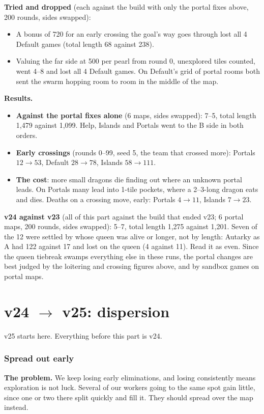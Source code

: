 \documentclass[11pt,a4paper]{article}
\begin{document}
\textbf{Tried and dropped} (each against the build with only the portal fixes above, 200 rounds, sides swapped):
\begin{itemize}
  \item A bonus of 720 for an early crossing the goal's way goes through lost all 4 Default games (total length 68 against 238).
  \item Valuing the far side at 500 per pearl from round 0, unexplored tiles counted, went 4--8 and lost all 4 Default games.
        On Default's grid of portal rooms both sent the swarm hopping room to room in the middle of the map.
\end{itemize}
\textbf{Results.}
\begin{itemize}
  \item \textbf{Against the portal fixes alone} (6 maps, sides swapped): 7--5, total length 1,479 against 1,099.
        Help, Islands and Portals went to the B side in both orders.
  \item \textbf{Early crossings} (rounds 0--99, seed 5, the team that crossed more): Portals $12 \rightarrow 53$, Default $28 \rightarrow 78$,
        Islands $58 \rightarrow 111$.
  \item \textbf{The cost}: more small dragons die finding out where an unknown portal leads. On Portals many lead into
        1-tile pockets, where a 2--3-long dragon eats and dies. Deaths on a crossing move, early: Portals $4 \rightarrow 11$,
        Islands $7 \rightarrow 23$.
\end{itemize}
\textbf{v24 against v23} (all of this part against the build that ended v23; 6 portal maps, 200 rounds, sides swapped): 5--7,
total length 1,275 against 1,201. Seven of the 12 were settled by whose queen was alive or longer, not by length: Autarky as A
had 122 against 17 and lost on the queen (4 against 11). Read it as even. Since the queen tiebreak swamps everything else in
these runs, the portal changes are best judged by the loitering and crossing figures above, and by sandbox games on portal maps.

\part{v24 $\rightarrow$ v25: dispersion}
v25 starts here. Everything before this part is v24.

\section{Spread out early}\label{sec:disperse}
\textbf{The problem.} We keep losing early eliminations, and losing consistently means exploration is not luck. Several of our
workers going to the same spot gain little, since one or two there split quickly and fill it. They should spread over the map
instead.
\end{document}

